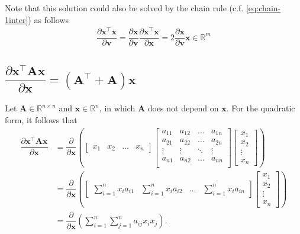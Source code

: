 \documentclass{article}
\newcommand{\trans}{\top}
\begin{document}
Note that this solution could also be solved by the chain rule (c.f. \eqref{eq:chain-1inter}) as follows
\begin{align}
    \boxed{\dfrac{\partial \mathbf{x}^\trans \mathbf{x}}{\partial \mathbf{v}} = \dfrac{\partial \mathbf{x}}{\partial \mathbf{v}} \dfrac{\partial \mathbf{x}^\trans \mathbf{x}}{\partial \mathbf{x}} = 2\dfrac{\partial \mathbf{x}}{\partial \mathbf{v}}\mathbf{x} \in \mathbb{R}^m}
\end{align}

\subsection{\(\dfrac{\partial \mathbf{x}^\trans \mathbf{A} \mathbf{x}}{\partial \mathbf{x}} = \left(\mathbf{A}^\trans + \mathbf{A}\right) \mathbf{x}\)}
Let \(\mathbf{A}\in \mathbb{R}^{n\times n}\) and \(\mathbf{x} \in \mathbb{R}^{n}\), in which \(\mathbf{A}\) does not depend on \(\mathbf{x}\). For the quadratic form, it follows that
\begin{align}
    \dfrac{\partial \mathbf{x}^\trans \mathbf{A} \mathbf{x}}{\partial \mathbf{x}} &= \dfrac{\partial}{\partial \mathbf{x}} \left(
    \begin{bmatrix}
        x_{1} & x_{2} & \dots & x_{n}
    \end{bmatrix}
    \begin{bmatrix}
        a_{11} & a_{12} & \dots & a_{1n} \\
        a_{21} & a_{22} & \dots & a_{2n} \\
        \vdots & \vdots & \ddots & \vdots \\
        a_{n1} & a_{n2} & \dots & a_{nn} \\
    \end{bmatrix} \begin{bmatrix}
        x_{1} \\ x_{2} \\ \vdots \\ x_{n}
    \end{bmatrix} \right) \\
    &= \dfrac{\partial}{\partial \mathbf{x}} \left(
			\begin{bmatrix}
				\displaystyle \sum_{i = 1}^{n} x_{i}a_{i1} & 
				\displaystyle \sum_{i = 1}^{n} x_{i}a_{i2} & 
				\dots & 
				\displaystyle \sum_{i = 1}^{n} x_{i}a_{in}
			\end{bmatrix} \begin{bmatrix}
				x_{1} \\ x_{2} \\ \vdots \\ x_{n}
			\end{bmatrix} \right) \\
            &= \dfrac{\partial}{\partial \mathbf{x}} \left(
				\sum_{i = 1}^{n}\sum_{j = 1}^{n} a_{ij} x_{i} x_{j}
			\right).
\end{align}
\end{document}

